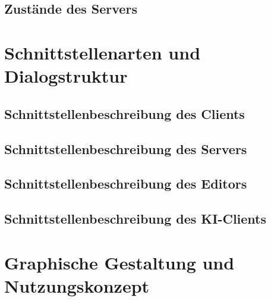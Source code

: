 \documentclass{uulm-assignment}
\begin{document}
\subsection{Zustände des Servers}

\clearpage

\section{Schnittstellenarten und Dialogstruktur}
\subsection{Schnittstellenbeschreibung des Clients}

\clearpage

\subsection{Schnittstellenbeschreibung des Servers}

\clearpage

\subsection{Schnittstellenbeschreibung des Editors}

\clearpage

\subsection{Schnittstellenbeschreibung des KI-Clients}

\clearpage

\section{Graphische Gestaltung und Nutzungskonzept}

\clearpage
\end{document}
